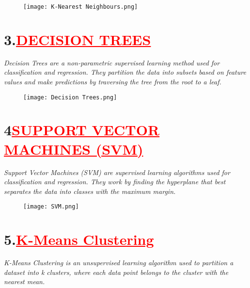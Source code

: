 \documentclass[12pt]{article}
\begin{document}
\begin{figure}
    \centering
    \texttt{[image: K-Nearest Neighbours.png]}
\end{figure} \vspace{2cm} 
\section*{\textbf{\hspace{1cm}3.\hspace{0.25cm}\textcolor{red}{\underline{\large{DECISION TREES}}}}}

\hspace{1cm}\large{\emph{Decision Trees are a non-parametric supervised learning method used for classification and regression. They partition the data into subsets based on feature values and make predictions by traversing the tree from the root to a leaf.}}\vspace{0.25cm}
\begin{figure}
    \centering
    \texttt{[image: Decision Trees.png]}
\end{figure}


\section*{\textbf{\hspace{1cm}4\hspace{1cm}\textcolor{red}{\underline{\large{SUPPORT VECTOR MACHINES (SVM)}}}}}

\hspace{1cm}\large{\emph{Support Vector Machines (SVM) are supervised learning algorithms used for classification and regression. They work by finding the hyperplane that best separates the data into classes with the maximum margin.}}\vspace{0.25cm}\newline 

\begin{figure}
    \centering
    \texttt{[image: SVM.png]}
\end{figure}

\section*{\textbf{\hspace{1cm}5.\hspace{1cm}\textcolor{red}{\underline{\large{K-Means Clustering}}}}}
\hspace{1cm}\large{\emph{K-Means Clustering is an unsupervised learning algorithm used to partition a dataset into k clusters, where each data point belongs to the cluster with the nearest mean.}}
\end{document}
